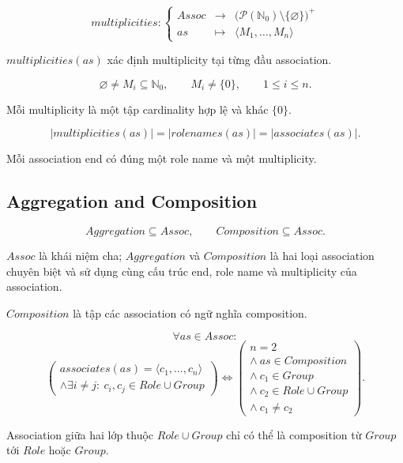 \documentclass[12pt,a4paper]{article}
\theoremstyle{definition}
\begin{document}
\[
multiplicities:
\left\{
\begin{array}{rcl}
Assoc
& \to &
\bigl(
\mathcal{P}(\mathbb{N}_0)\setminus\{\varnothing\}
\bigr)^{+}
\\
as
& \mapsto &
\langle M_1,\ldots,M_n\rangle
\end{array}
\right.
\]

$multiplicities(as)$ xác định multiplicity tại từng đầu association.

\[
\varnothing\neq M_i\subseteq\mathbb{N}_0,
\qquad
M_i\neq\{0\},
\qquad
1\leq i\leq n.
\]

Mỗi multiplicity là một tập cardinality hợp lệ và khác $\{0\}$.

\[
|multiplicities(as)|
=
|rolenames(as)|
=
|associates(as)|.
\]

Mỗi association end có đúng một role name và một multiplicity.




\subsection{Aggregation and Composition}

\[
Aggregation\subseteq Assoc,
\qquad
Composition\subseteq Assoc.
\]

$Assoc$ là khái niệm cha; $Aggregation$ và $Composition$ là hai loại
association chuyên biệt và sử dụng cùng cấu trúc end, role name và
multiplicity của association.

$Composition$ là tập các association có ngữ nghĩa composition.

\[
\forall as\in Assoc:
\]
\[
\left(
\begin{array}{c}
associates(as)=\langle c_1,\ldots,c_n\rangle
\\[1mm]
\land
\exists i\neq j:\ c_i,c_j\in Role\cup Group
\end{array}
\right)
\iff
\left(
\begin{array}{c}
n=2
\\
\land\ as\in Composition
\\
\land\ c_1\in Group
\\
\land\ c_2\in Role\cup Group
\\
\land\ c_1\neq c_2
\end{array}
\right).
\tag{WF-6}
\]

Association giữa hai lớp thuộc $Role\cup Group$ chỉ có thể là composition từ $Group$ tới $Role$ hoặc $Group$.
\end{document}

